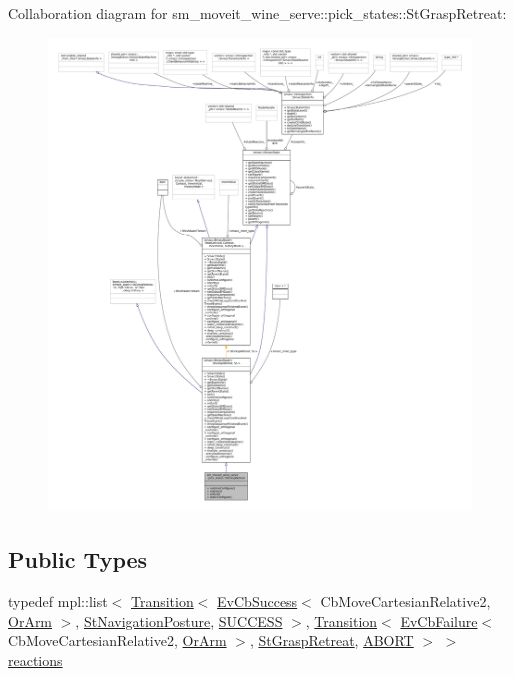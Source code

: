 Collaboration diagram for sm\+\_\+moveit\+\_\+wine\+\_\+serve\+:\+:pick\+\_\+states\+:\+:St\+Grasp\+Retreat\+:
\nopagebreak
\begin{figure}[H]
\begin{center}
\leavevmode
\includegraphics[width=350pt]{structsm__moveit__wine__serve_1_1pick__states_1_1StGraspRetreat__coll__graph}
\end{center}
\end{figure}
\subsection*{Public Types}
\begin{DoxyCompactItemize}
\item 
typedef mpl\+::list$<$ \hyperlink{classsmacc_1_1Transition}{Transition}$<$ \hyperlink{structsmacc_1_1EvCbSuccess}{Ev\+Cb\+Success}$<$ Cb\+Move\+Cartesian\+Relative2, \hyperlink{classsm__moveit__wine__serve_1_1OrArm}{Or\+Arm} $>$, \hyperlink{structsm__moveit__wine__serve_1_1StNavigationPosture}{St\+Navigation\+Posture}, \hyperlink{structsmacc_1_1default__transition__tags_1_1SUCCESS}{S\+U\+C\+C\+E\+SS} $>$, \hyperlink{classsmacc_1_1Transition}{Transition}$<$ \hyperlink{structsmacc_1_1EvCbFailure}{Ev\+Cb\+Failure}$<$ Cb\+Move\+Cartesian\+Relative2, \hyperlink{classsm__moveit__wine__serve_1_1OrArm}{Or\+Arm} $>$, \hyperlink{structsm__moveit__wine__serve_1_1pick__states_1_1StGraspRetreat}{St\+Grasp\+Retreat}, \hyperlink{structsmacc_1_1default__transition__tags_1_1ABORT}{A\+B\+O\+RT} $>$ $>$ \hyperlink{structsm__moveit__wine__serve_1_1pick__states_1_1StGraspRetreat_a9be94d330d253cec5a7ac2a740bc6d38}{reactions}
\end{DoxyCompactItemize}

